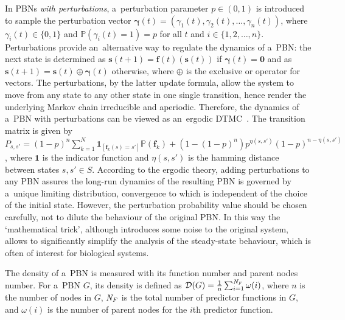 \documentclass[runningheads,a4paper]{llncs}
\begin{document}
In PBNs \emph{with perturbations}, a~perturbation parameter $p \in (0,1)$ is introduced to sample
the perturbation vector
$\boldsymbol{\gamma}(t)=(\gamma_{1}(t),\gamma_{2}(t),\ldots,\gamma_{n}(t))$, where $\gamma_{i}(t)
\in \{0,1\}$ and $\mathbb{P}(\gamma_{i}(t)=1)=p$ for all $t$ and $i \in \{1,2,\ldots,n\}$.
Perturbations provide an~alternative way to regulate the dynamics of a~PBN: the next state is
determined as $\boldsymbol{s}(t+1)= \boldsymbol{f}(t)(\boldsymbol{s}(t))$ if
$\boldsymbol{\gamma}(t)=\boldsymbol{0}$ and as $\boldsymbol{s}(t+1)=\boldsymbol{s}(t) \oplus
\boldsymbol{\gamma}(t)$ otherwise, where $\oplus$ is the exclusive or operator for vectors. The
perturbations, by the latter update formula, allow the system to move from any state to any other
state in one single transition, hence render the underlying Markov chain irreducible and
aperiodic. Therefore, the dynamics of a~PBN with perturbations can be viewed as an~ergodic
DTMC~\cite{SD10}. The transition matrix is given by
$P_{s,s'}=(1-p)^n \sum_{k=1}^{N}\boldsymbol{1}_{[\boldsymbol{f}_k(s)=s']}
\mathbb{P}(\boldsymbol{f}_k)+(1-(1-p)^n)p^{\eta(s,s')}(1-p)^{n-\eta(s,s')}$, where
$\boldsymbol{1}$ is the indicator function and $\eta(s,s')$ is the hamming distance between states
$s,s' \in S$.
According to the ergodic theory, adding perturbations to any PBN assures the long-run dynamics of
the resulting PBN is governed by a~unique limiting distribution, convergence to which is
independent of the choice of the initial state. However, the perturbation probability value should
be chosen carefully, not to dilute the behaviour of the original PBN. In this way the
`mathematical trick', although introduces some noise to the original system, allows to
significantly simplify the analysis of the steady-state behaviour, which is often of interest for
biological systems.

The density of a~PBN is measured with its function number and parent nodes number. For a~PBN $G$,
its density is defined as $\mathcal{D}(G)=\frac{1}{n}\sum_{i=1}^{\it N_F}\omega(i)$, where $n$ is
the number of nodes in $G$, ${\it N_F}$ is the total number of predictor functions in $G$, and
$\omega(i)$ is the number of parent nodes for the $i$th predictor function.
\end{document}
